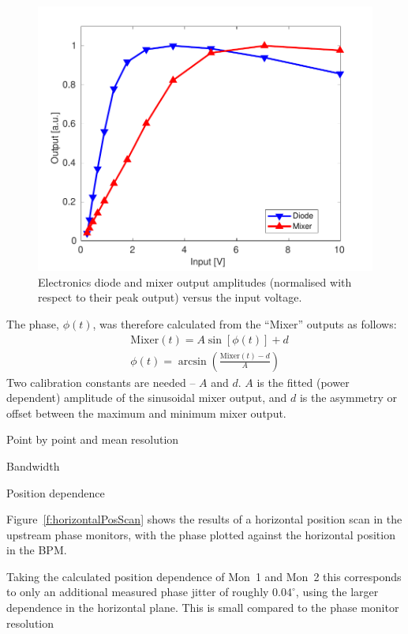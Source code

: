 \documentclass[%
 reprint,
 superscriptaddress,
 amsmath,
 amssymb,
 prstab,
]{revtex4-1}
\begin{document}
\begin{figure}
	\includegraphics[width=\columnwidth]{figs/hw/MixDioVsVolts}
	\caption{\label{f:MixDioVsVolts}Electronics diode and mixer output 
	amplitudes (normalised with respect to their peak output) versus the input 
	voltage.}
\end{figure}

The phase, \(\phi(t)\), was therefore calculated from the ``Mixer'' outputs as 
follows:
\begin{align}
	&\mathrm{Mixer}(t) = A\sin[\phi(t)] + d \\
	&\phi(t) = \arcsin\left(\frac{\mathrm{Mixer}(t)-d}{A}\right)
	\label{e:phaseRecUsed}
\end{align}
Two calibration constants are needed -- \(A\) and \(d\). \(A\) is the fitted 
(power dependent) 
amplitude of the sinusoidal mixer output, and \(d\) is the asymmetry or offset 
between the maximum and minimum mixer output.

Point by point and mean resolution

Bandwidth

Position dependence

Figure~\ref{f:horizontalPosScan} shows the results of a horizontal position 
scan in the upstream phase monitors, with the phase plotted against the 
horizontal position in the BPM.

Taking the calculated position dependence of Mon~1 and Mon~2 this corresponds 
to only an additional measured phase jitter of roughly \(0.04^\circ\), using 
the larger dependence in the horizontal plane. This is small compared to the 
phase monitor resolution
\end{document}
